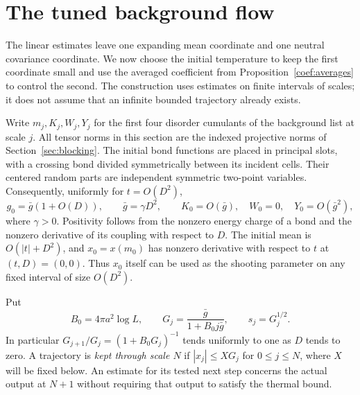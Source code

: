 \section{The tuned background flow}\label{sec:flow}
The linear estimates leave one expanding mean coordinate and one neutral
covariance coordinate.  We now choose the initial temperature to keep the
first coordinate small and use the averaged coefficient from
Proposition~\ref{coef:averages} to control the second.  The construction uses
estimates on finite intervals of scales; it does not assume that an infinite
bounded trajectory already exists.

Write $m_j,K_j,W_j,Y_j$ for the first four disorder cumulants of the
background list at scale $j$.  All tensor norms in this section are the
indexed projective norms of Section~\ref{sec:blocking}.  The initial bond
functions are placed in principal slots, with a crossing bond divided
symmetrically between its incident cells.  Their centered random parts are
independent symmetric two-point variables.  Consequently, uniformly for
$t=O(D^2)$,
\begin{equation}\label{flow:initial}
 g_0=\bar g(1+O(D)),\qquad \bar g=\gamma D^2,
 \qquad K_0=O(\bar g),\quad W_0=0,\quad Y_0=O(\bar g^2),
\end{equation}
where $\gamma>0$.  Positivity follows from the nonzero energy charge of a
bond and the nonzero derivative of its coupling with respect to $D$.
The initial mean is $O(|t|+D^2)$, and $x_0=x(m_0)$ has nonzero derivative
with respect to $t$ at $(t,D)=(0,0)$.  Thus $x_0$ itself can be used as the
shooting parameter on any fixed interval of size $O(D^2)$.

Put
\begin{equation}\label{flow:comparison-sequence}
 B_0=4\pi a^2\log L,\qquad
 G_j=\frac{\bar g}{1+B_0j\bar g},\qquad s_j=G_j^{1/2}.
\end{equation}
In particular $G_{j+1}/G_j=(1+B_0G_j)^{-1}$ tends uniformly to one as
$D$ tends to zero.  A trajectory is \emph{kept through scale $N$} if
$|x_j|\le XG_j$ for $0\le j\le N$, where $X$ will be fixed below.
An estimate for its tested next step concerns the actual output at $N+1$
without requiring that output to satisfy the thermal bound.

